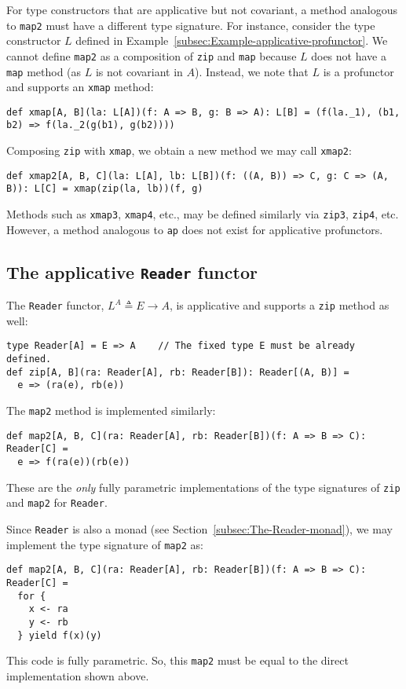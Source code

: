 For type constructors that are applicative but not covariant, a method
analogous to \lstinline!map2! must have a different type signature.
For instance, consider the type constructor $L$ defined in Example~\ref{subsec:Example-applicative-profunctor}.
We cannot define \lstinline!map2! as a composition of \lstinline!zip!
and \lstinline!map! because $L$ does not have a \lstinline!map!
method (as $L$ is not covariant in $A$). Instead, we note that $L$
is a profunctor and supports an \lstinline!xmap!
method:
\begin{lstlisting}
def xmap[A, B](la: L[A])(f: A => B, g: B => A): L[B] = (f(la._1), (b1, b2) => f(la._2(g(b1), g(b2))))
\end{lstlisting}
Composing \lstinline!zip! with \lstinline!xmap!, we obtain a new
method we may call \lstinline!xmap2!:
\begin{lstlisting}
def xmap2[A, B, C](la: L[A], lb: L[B])(f: ((A, B)) => C, g: C => (A, B)): L[C] = xmap(zip(la, lb))(f, g)
\end{lstlisting}
Methods such as \lstinline!xmap3!, \lstinline!xmap4!, etc., may
be defined similarly via \lstinline!zip3!, \lstinline!zip4!, etc.
However, a method analogous to \lstinline!ap! does not exist for
applicative profunctors.

\subsection{The applicative \texttt{Reader} functor\label{subsec:The-applicative-Reader-functor}}

The \lstinline!Reader! functor, $L^{A}\triangleq E\rightarrow A$,
is applicative and supports a \lstinline!zip! method as well:
\begin{lstlisting}
type Reader[A] = E => A    // The fixed type E must be already defined.
def zip[A, B](ra: Reader[A], rb: Reader[B]): Reader[(A, B)] =
  e => (ra(e), rb(e))
\end{lstlisting}
The \lstinline!map2! method is implemented similarly:
\begin{lstlisting}
def map2[A, B, C](ra: Reader[A], rb: Reader[B])(f: A => B => C): Reader[C] =
  e => f(ra(e))(rb(e))
\end{lstlisting}
These are the \emph{only} fully parametric implementations of the
type signatures of \lstinline!zip! and \lstinline!map2! for \lstinline!Reader!.

Since \lstinline!Reader! is also a monad (see Section~\ref{subsec:The-Reader-monad}),
we may implement the type signature of \lstinline!map2! as:
\begin{lstlisting}
def map2[A, B, C](ra: Reader[A], rb: Reader[B])(f: A => B => C): Reader[C] =
  for {
    x <- ra
    y <- rb
  } yield f(x)(y)
\end{lstlisting}
This code is fully parametric. So, this \lstinline!map2! must be
equal to the direct implementation shown above.

